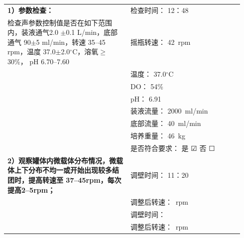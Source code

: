 \documentclass[UTF8,10pt,a4paper,fontset=fandol]{ctexart}
\newcommand{\fieldvalue}[1]{#1}
\newcommand{\handwritten}[1]{#1}
\newcommand{\checkboxfield}[1]{\ifstrequal{#1}{checked}{☑}{\ifstrequal{#1}{unclear}{?}{☐}}}
\begin{document}
\noindent
\begin{tabular}{|p{0.49\linewidth}|p{0.45\linewidth}|}
\hline
\textbf{1）参数检查：} &
检查时间：
\fieldvalue{\handwritten{12：48}}
\\[-2pt]
检查声参数控制值是否在如下范围内，装液通气2.0
$\pm$0.1 L/min，底部通气 90$\pm$5 ml/min，转速
35--45 rpm，温度 37.0$\pm$2.0$^\circ$C，溶氧$\geq$30\%，
pH 6.70--7.60 &
摇瓶转速：
\fieldvalue{\handwritten{42}}\ rpm
\\
&
温度：
\fieldvalue{\handwritten{37.0}}$^\circ$C
\\
&
DO：
\fieldvalue{\handwritten{54\%}}
\\
&
pH：
\fieldvalue{\handwritten{6.91}}
\\
&
装液流量：
\fieldvalue{\handwritten{2000}}\ ml/min
\\
&
底部流量：
\fieldvalue{\handwritten{40}}\ ml/min
\\
&
培养重量：
\fieldvalue{\handwritten{46}}\ kg
\\
&
是否符合要求：
是
\fieldvalue{\handwritten{\checkboxfield{checked}}}
\quad
否
\fieldvalue{\checkboxfield{unchecked}}
\\
\hline
\textbf{2）观察罐体内微载体分布情况，微载体上下分布不均一或开始出现较多结团时，提高转速至
37--45rpm，每次提高2--5rpm；} &
调壁时间：
\fieldvalue{\handwritten{11：20}}
\\[-2pt]
&
调整后转速：\underline{\hspace{1.2cm}}\ rpm
\\[4pt]
&
调壁时间：\underline{\hspace{1.2cm}}
\\[-2pt]
&
调整后转速：\underline{\hspace{1.2cm}}\ rpm
\\[4pt]

\end{tabular}
\end{document}
